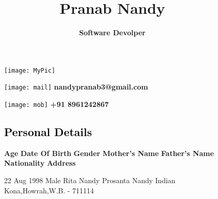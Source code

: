 \documentclass[12pt]{article}
\title{\textbf{Pranab Nandy}}
\author{\textbf{Software Devolper}}
\date{}
\begin{document}
\begin{figure}[!hbt]
\centering
\texttt{[image: MyPic]}
\vspace*{-0.5in}
\maketitle
\end{figure}
\vspace*{-0.9in}
\begin{figure}[!hbt]
\begin{minipage}{0.48\textwidth}
\vspace{0.3in}
\texttt{[image: mail]}
\textbf{nandypranab3@gmail.com}
\end{minipage}
\hfill
\begin{minipage}{0.48\textwidth}
\vspace{0.3in}
\texttt{[image: mob]}
\textbf{+91 8961242867}
\end{minipage}

\end{figure}


\begin{figure}[!hbt]
\begin{tcolorbox}
\subsection*{\textcolor{black}{Personal Details}}
\end{tcolorbox}
\bigbreak
\hspace*{0.5in}
\begin{minipage}{0.48\textwidth}

\textbf{Age}
\bigbreak
\textbf{Date Of Birth}
\bigbreak
\textbf{Gender}
\bigbreak
\textbf{Mother's Name}
\bigbreak
\textbf{Father's Name}
\bigbreak
\textbf{Nationality}
\bigbreak
\textbf{Address}
\end{minipage}
\begin{minipage}{0.48\textwidth}

22
 Aug 1998
\bigbreak
Male
\bigbreak
Rita Nandy
\bigbreak
Prosanta Nandy
\bigbreak
Indian
 Kona,Howrah,W.B. - 711114
\end{minipage}
\end{figure}
\end{document}
